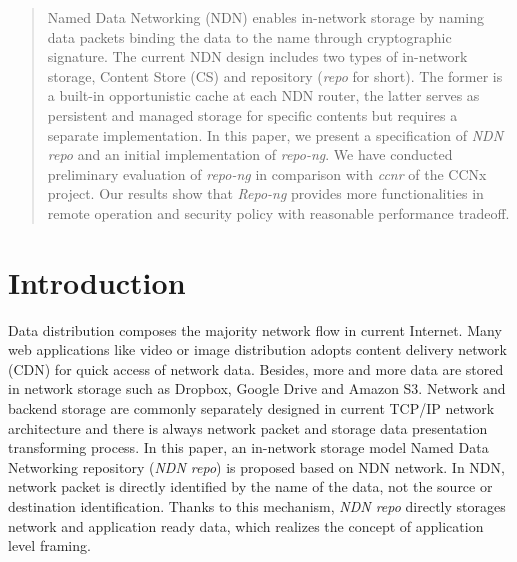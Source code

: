 \documentclass[conference]{IEEEtran}
\begin{document}
\begin{abstract}
Named Data Networking (NDN) enables in-network storage by naming data packets binding the data to the name through cryptographic signature.  The current NDN design includes two types of in-network storage, Content Store (CS) and repository (\emph{repo} for short).  The former is a built-in opportunistic cache at each NDN router, the latter serves as persistent and managed storage for specific contents but requires a separate implementation. In this paper, we present a specification of \emph{NDN repo} and an initial implementation of \emph{repo-ng}.  We have conducted preliminary evaluation of \emph{repo-ng} in comparison with \emph{ccnr} of the CCNx project.  Our results show that \emph{Repo-ng} provides more functionalities in remote operation and security policy with reasonable performance tradeoff.

\end{abstract}





%
\IEEEpeerreviewmaketitle

\section{Introduction}

Data distribution composes the majority network flow in current Internet. Many web applications like video or image distribution adopts content delivery network (CDN) for quick access of network data. Besides, more and more data are stored in network storage such as Dropbox, Google Drive and Amazon S3. Network and backend storage are commonly separately designed in current TCP/IP network architecture and there is always network packet and storage data presentation transforming process. In this paper, an in-network storage model Named Data Networking repository (\emph{NDN repo}) is proposed based on NDN network. In NDN, network packet is directly identified by the name of the data, not the source or destination identification. Thanks to this mechanism, \emph{NDN repo} directly storages network and application ready data, which realizes the concept of application level framing. \cite{clark1990architectural}
\end{document}

